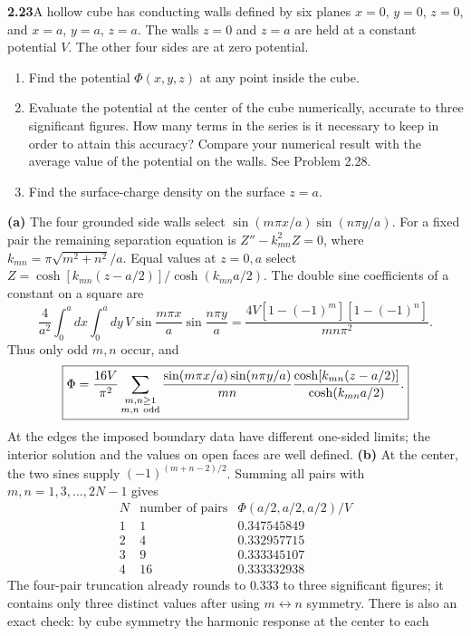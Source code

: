 \par\bigskip
\noindent\textbf{2.23}\quad A hollow cube has conducting walls defined by six planes $x=0$, $y=0$, $z=0$, and $x=a$, $y=a$, $z=a$. The walls $z=0$ and $z=a$ are held at a constant potential $V$. The other four sides are at zero potential.
\begin{enumerate}
\item[(a)] Find the potential $\Phi(x,y,z)$ at any point inside the cube.
\item[(b)] Evaluate the potential at the center of the cube numerically, accurate to three significant figures. How many terms in the series is it necessary to keep in order to attain this accuracy? Compare your numerical result with the average value of the potential on the walls. See Problem 2.28.
\item[(c)] Find the surface-charge density on the surface $z=a$.
\end{enumerate}
\solution
\textbf{(a)} The four grounded side walls select
$\sin(m\pi x/a)\sin(n\pi y/a)$. For a fixed pair the remaining
separation equation is $Z''-k_{mn}^2Z=0$, where
$k_{mn}=\pi\sqrt{m^2+n^2}/a$. Equal values at $z=0,a$ select
$Z=\cosh[k_{mn}(z-a/2)]/\cosh(k_{mn}a/2)$.
The double sine coefficients of a constant on a square are
\[
\frac4{a^2}\int_0^a\!dx\int_0^a\!dy\,
 V\sin\frac{m\pi x}a\sin\frac{n\pi y}a
=\frac{4V[1-(-1)^m][1-(-1)^n]}{mn\pi^2}.
\]
Thus only odd $m,n$ occur, and
\[
\boxed{\Phi=\frac{16V}{\pi^2}
 \sum_{\substack{m,n\geq1\\m,n\ {\rm odd}}}
 \frac{\sin(m\pi x/a)\sin(n\pi y/a)}{mn}
 \frac{\cosh[k_{mn}(z-a/2)]}{\cosh(k_{mn}a/2)}.}
\]
At the edges the imposed boundary data have different one-sided
limits; the interior solution and the values on open faces are
well defined.
\textbf{(b)} At the center, the two sines supply
$(-1)^{(m+n-2)/2}$. Summing all pairs with $m,n=1,3,\ldots,2N-1$
gives
\[
\begin{array}{c|c|c}
N&\text{number of pairs}&\Phi(a/2,a/2,a/2)/V\\\hline
1&1&0.347545849\\
2&4&0.332957715\\
3&9&0.333345107\\
4&16&0.333332938
\end{array}
\]
The four-pair truncation already rounds to $0.333$ to three
significant figures; it contains only three distinct values after
using $m\leftrightarrow n$ symmetry. There is also an exact check:
by cube symmetry the harmonic response at the center to each
